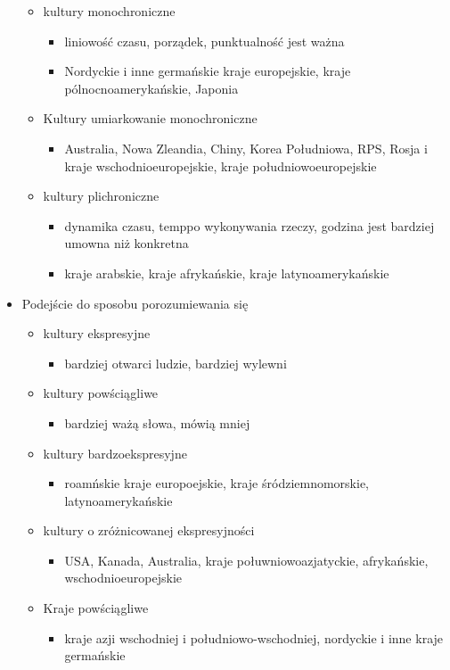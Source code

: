 \documentclass[a4paper,10pt]{report}
\begin{document}
\begin{itemize}
	\begin{itemize}
		\item kultury monochroniczne
		\begin{itemize}
			\item liniowość czasu, porządek, punktualność jest ważna
			\item Nordyckie i inne germańskie kraje europejskie, kraje pólnocnoamerykańskie, Japonia
		\end{itemize}
		\item Kultury umiarkowanie monochroniczne
		\begin{itemize}
			\item Australia, Nowa Zleandia, Chiny, Korea Południowa, RPS, Rosja i kraje wschodnioeuropejskie, kraje południowoeuropejskie
		\end{itemize}
		\item kultury plichroniczne
		\begin{itemize}
			\item dynamika czasu, temppo wykonywania rzeczy, godzina jest bardziej umowna niż konkretna
			\item kraje arabskie, kraje afrykańskie, kraje latynoamerykańskie
		\end{itemize}
	\end{itemize}
	\item Podejście do sposobu porozumiewania się
	\begin{itemize}
		\item kultury ekspresyjne
		\begin{itemize}
			\item bardziej otwarci ludzie, bardziej wylewni
		\end{itemize}
		\item kultury powściągliwe
		\begin{itemize}
			\item bardziej ważą słowa, mówią mniej
		\end{itemize}
		\item kultury bardzoekspresyjne
		\begin{itemize}
			\item roamńskie kraje europoejskie, kraje śródziemnomorskie, latynoamerykańskie
		\end{itemize}
		\item kultury o zróżnicowanej ekspresyjności
		\begin{itemize}
			\item USA, Kanada, Australia, kraje połuwniowoazjatyckie, afrykańskie, wschodnioeuropejskie
		\end{itemize}
		\item Kraje powściągliwe
		\begin{itemize}
			\item kraje azji wschodniej i południowo-wschodniej, nordyckie i inne kraje germańskie
		\end{itemize}
	\end{itemize}
\end{itemize}
\end{document}
